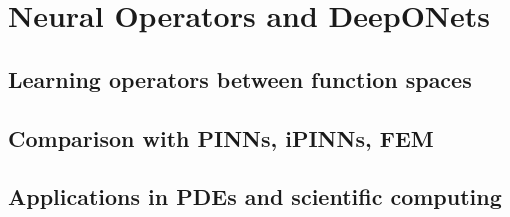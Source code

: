 ﻿\chapter{Neural Operators and DeepONets}
\section{Learning operators between function spaces}

\section{Comparison with PINNs, iPINNs, FEM}

\section{Applications in PDEs and scientific computing}


